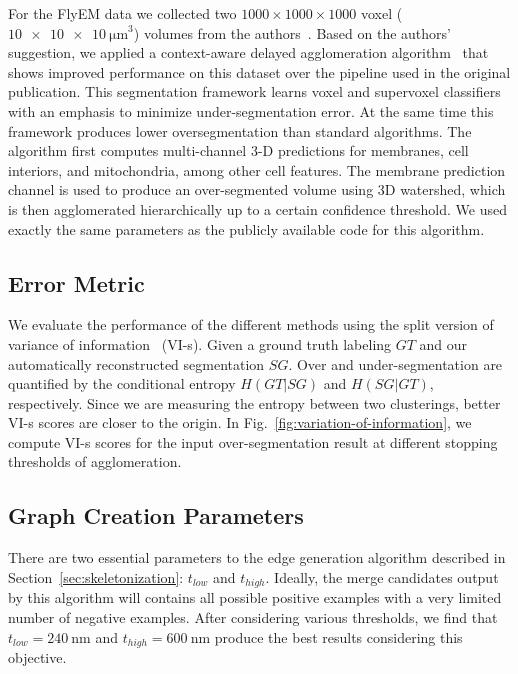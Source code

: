 For the FlyEM data we collected two $1000 \times 1000 \times 1000$ voxel ($\SI[product-units=single]{10x10x10}{\micro\meter}^3$) volumes from the authors~\cite{takemura2017connectome}. Based on the authors' suggestion, we applied a context-aware delayed agglomeration algorithm~\cite{10.1371/journal.pone.0125825} that shows improved performance on this dataset over the pipeline used in the original publication. This segmentation framework learns voxel and supervoxel classifiers with an emphasis to minimize under-segmentation error. At the same time this framework produces lower oversegmentation than standard algorithms. The algorithm first computes multi-channel 3-D predictions for membranes, cell interiors, and mitochondria, among other cell features. The membrane prediction channel is used to produce an over-segmented volume using 3D watershed, which is then agglomerated hierarchically up to a certain confidence threshold. We used exactly the same parameters as the publicly available code for this algorithm.

\subsection{Error Metric}
\label{sec:variation-of-information}

We evaluate the performance of the different methods using the split version of variance of information~\cite{meila2003comparing} (VI-s). Given a ground truth labeling $GT$ and our automatically reconstructed segmentation $SG$.
Over and under-segmentation are quantified by the conditional entropy $H(GT | SG)$ and $H(SG | GT)$, respectively. Since we are measuring the entropy between two clusterings, better VI-s scores are closer to the origin.
In Fig.~\ref{fig:variation-of-information}, we compute VI-s scores for the input over-segmentation result at different stopping thresholds of agglomeration.

\subsection{Graph Creation Parameters}

There are two essential parameters to the edge generation algorithm described in Section~\ref{sec:skeletonization}: $t_{low}$ and $t_{high}$. Ideally, the merge candidates output by this algorithm will contains all possible positive examples with a very limited number of negative examples. After considering various thresholds, we find that $t_{low} = \SI{240}{\nano\meter}$ and $t_{high} = \SI{600}{\nano\meter}$ produce the best results considering this objective.

